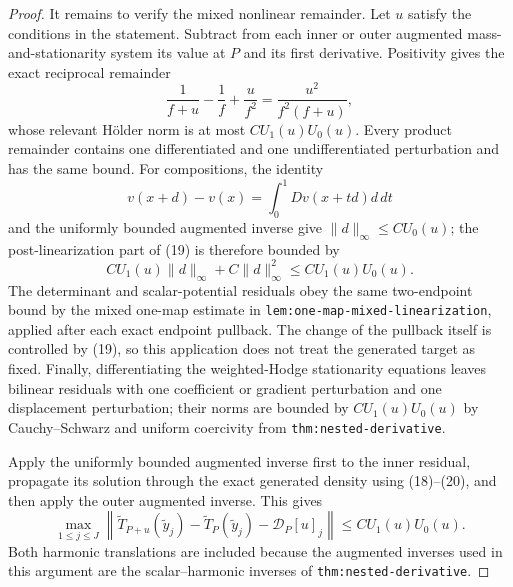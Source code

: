\documentclass{article}
\begin{document}
\begin{proof}
It remains to verify the mixed nonlinear remainder.  Let \(u\) satisfy the conditions in the statement.  Subtract from each inner or outer augmented mass-and-stationarity system its value at \(P\) and its first derivative.  Positivity gives the exact reciprocal remainder
\[
 \frac1{f+u}-\frac1f+\frac{u}{f^2}
 =\frac{u^2}{f^2(f+u)},
\tag{18}
\]
whose relevant H\"older norm is at most \(CU_1(u)U_0(u)\).  Every product remainder contains one differentiated and one undifferentiated perturbation and has the same bound.  For compositions, the identity
\[
 v(x+d)-v(x)=\int_0^1Dv(x+td)d\,dt
\tag{19}
\]
and the uniformly bounded augmented inverse give
\(\lVert d\rVert_\infty\leq CU_0(u)\); the post-linearization part of (19) is therefore bounded by
\[
 CU_1(u)\lVert d\rVert_\infty+C\lVert d\rVert_\infty^2
 \leq CU_1(u)U_0(u).
\tag{20}
\]
The determinant and scalar-potential residuals obey the same two-endpoint bound by the mixed one-map estimate in
\texttt{lem:one-map-mixed-linearization}, applied after each exact endpoint pullback.  The change of the pullback itself is controlled by (19), so this application does not treat the generated target as fixed.  Finally, differentiating the weighted-Hodge stationarity equations leaves bilinear residuals with one coefficient or gradient perturbation and one displacement perturbation; their norms are bounded by \(CU_1(u)U_0(u)\) by Cauchy--Schwarz and uniform coercivity from
\texttt{thm:nested-derivative}.

Apply the uniformly bounded augmented inverse first to the inner residual, propagate its solution through the exact generated density using (18)--(20), and then apply the outer augmented inverse.  This gives
\[
 \max_{1\leq j\leq J}
 \left\lVert
 \widetilde T_{P+u}(\widetilde y_j)-\widetilde T_P(\widetilde y_j)
 -\mathcal D_P[u]_j
 \right\rVert
 \leq CU_1(u)U_0(u).
\tag{21}
\]
Both harmonic translations are included because the augmented inverses used in this argument are the scalar--harmonic inverses of
\texttt{thm:nested-derivative}.


\end{proof}
\end{document}

